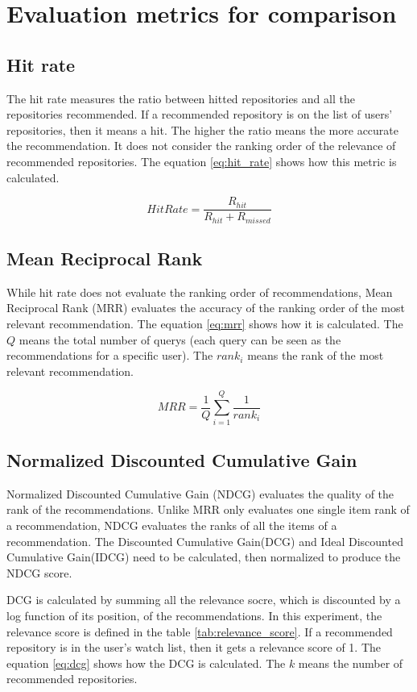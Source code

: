 \documentclass[11pt,twoside]{report}
\begin{document}
\section{Evaluation metrics for comparison}
\subsection{Hit rate}
The hit rate measures the ratio between hitted repositories and all the repositories recommended. If a recommended repository is on the list of users' repositories, then it means a hit. The higher the ratio means the more accurate the recommendation. It does not consider the ranking order of the relevance of recommended repositories. The equation \ref{eq:hit_rate} shows how this metric is calculated.

\begin{equation}
    HitRate=\frac{R_{hit}}{R_{hit}+R_{missed}}
    \label{eq:hit_rate}
\end{equation}

\subsection{Mean Reciprocal Rank}
While hit rate does not evaluate the ranking order of recommendations, Mean Reciprocal Rank (MRR) evaluates the accuracy of the ranking order of the most relevant recommendation. The equation \ref{eq:mrr} shows how it is calculated. The $Q$ means the total number of querys (each query can be seen as the recommendations for a specific user). The $rank_i$ means the rank of the most relevant recommendation.

\begin{equation}
    MRR=\frac{1}{Q}\sum_{i=1}^Q\frac{1}{rank_i}
    \label{eq:mrr}
\end{equation}

\subsection{Normalized Discounted Cumulative Gain}
Normalized Discounted Cumulative Gain (NDCG) evaluates the quality of the rank of the recommendations. Unlike MRR only evaluates one single item rank of a recommendation, NDCG evaluates the ranks of all the items of a recommendation. The Discounted Cumulative Gain(DCG) and Ideal Discounted Cumulative Gain(IDCG) need to be calculated, then normalized to produce the NDCG score. 

DCG is calculated by summing all the relevance socre, which is discounted by a log function of its position, of the recommendations. In this experiment, the relevance score is defined in the table \ref{tab:relevance_score}. If a recommended repository is in the user's watch list, then it gets a relevance score of 1. The equation \ref{eq:dcg} shows how the DCG is calculated. The $k$ means the number of recommended repositories.
\end{document}
